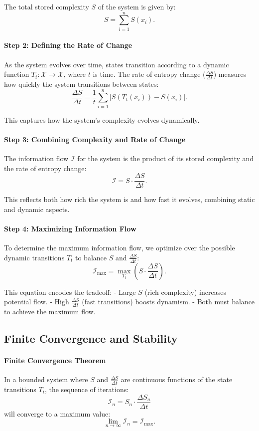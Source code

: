 \documentclass[12pt]{article}
\begin{document}
The total stored complexity \(S\) of the system is given by:
\[
S = \sum_{i=1}^n S(x_i).
\]

\paragraph{Step 2: Defining the Rate of Change}
As the system evolves over time, states transition according to a dynamic function \(T_t: \mathcal{X} \to \mathcal{X}\), where \(t\) is time. The rate of entropy change (\(\frac{\Delta S}{\Delta t}\)) measures how quickly the system transitions between states:
\[
\frac{\Delta S}{\Delta t} = \frac{1}{t} \sum_{i=1}^n |S(T_t(x_i)) - S(x_i)|.
\]

This captures how the system’s complexity evolves dynamically.

\paragraph{Step 3: Combining Complexity and Rate of Change}
The information flow \(\mathcal{I}\) for the system is the product of its stored complexity and the rate of entropy change:
\[
\mathcal{I} = S \cdot \frac{\Delta S}{\Delta t}.
\]

This reflects both how rich the system is and how fast it evolves, combining static and dynamic aspects.

\paragraph{Step 4: Maximizing Information Flow}
To determine the maximum information flow, we optimize over the possible dynamic transitions \(T_t\) to balance \(S\) and \(\frac{\Delta S}{\Delta t}\):
\[
\mathcal{I}_{\text{max}} = \max_{T_t} \left(S \cdot \frac{\Delta S}{\Delta t}\right).
\]

This equation encodes the tradeoff:
- Large \(S\) (rich complexity) increases potential flow.
- High \(\frac{\Delta S}{\Delta t}\) (fast transitions) boosts dynamism.
- Both must balance to achieve the maximum flow.

\subsection{Finite Convergence and Stability}

\paragraph{Finite Convergence Theorem}
In a bounded system where \(S\) and \(\frac{\Delta S}{\Delta t}\) are continuous functions of the state transitions \(T_t\), the sequence of iterations:
\[
\mathcal{I}_n = S_n \cdot \frac{\Delta S_n}{\Delta t}
\]
will converge to a maximum value:
\[
\lim_{n \to \infty} \mathcal{I}_n = \mathcal{I}_{\text{max}}.
\]
\end{document}
